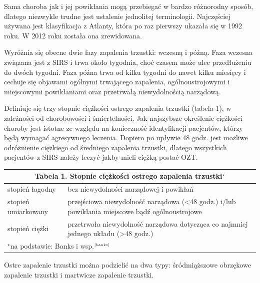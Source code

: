 \documentclass[a4paper, 12pt]{report}
\newcommand\cyt[1]{$^{\tiny{\cite{#1}}}$}
\begin{document}
Sama choroba jak i jej powikłania mogą przebiegać w bardzo różnorodny
sposób, dlatego niezwykle trudne jest ustalenie jednolitej
terminologii. Najczęściej używana jest klasyfikacja z Atlanty, która
po raz pierwszy ukazała się w 1992 roku. W 2012 roku została ona
zrewidowana.

Wyróżnia się obecne dwie fazy zapalenia trzustki: wczesną i
późną. Faza wczesna związana jest z SIRS i trwa około tygodnia, choć
czasem może ulec przedłużeniu do dwóch tygodni. Faza późna trwa od
kilku tygodni do nawet kilku miesięcy i cechuje się objawami ogólnymi
trwającego zapalenia, ogólnoustrojowymi i miejscowymi powikłaniami
oraz przetrwałą niewydolnością narządową.

Definiuje się trzy stopnie ciężkości ostrego zapalenia
trzustki (tabela 1),  w zależności od chorobowości i śmiertelności. Jak
najszybsze określenie ciężkości choroby jest istotne ze względu na
konieczność identyfikacji pacjentów, którzy będą wymagać agresywnego
leczenia. Dopiero po upływie 48 godz. jest możliwe odróżnienie
ciężkiego od średniego zapalenia trzustki, dlatego wszystkich
pacjentów z SIRS należy leczyć jakby mieli ciężką postać OZT.
\begin{table}[htbp]
\begin{center}
\begin{footnotesize}
\begin{tabular}{|p{4cm}|p{9cm}|}
\hline
\multicolumn{2}{|c|}{\cellcolor[gray]{0.9} \textbf{Tabela 1. Stopnie ciężkości ostrego zapalenia trzustki$^\star$}}\\
\hline \hline
stopień łagodny & bez niewydolności narządowej i powikłań\\ \hline
stopień umiarkowany & przejściowa niewydolność narządowa (<48
                           godz.) i/lub powikłania miejscowe bądź
                           ogólnoustrojowe\\ \hline
stopień ciężki & przetrwała niewydolność narządowa dotycząca
                       co najmniej jednego układu (>48 godz.)\\ \hline
\multicolumn{2}{|l|}{\scriptsize{$^\star$na podstawie: Banks i wsp.\cyt{banks}}}\\
\hline
\end{tabular}
\end{footnotesize}
\end{center}
\end{table}

Ostre zapalenie trzustki można podzielić na dwa typy: śródmiąższowe
obrzękowe zapalenie trzustki i martwicze zapalenie trzustki. 
\end{document}
